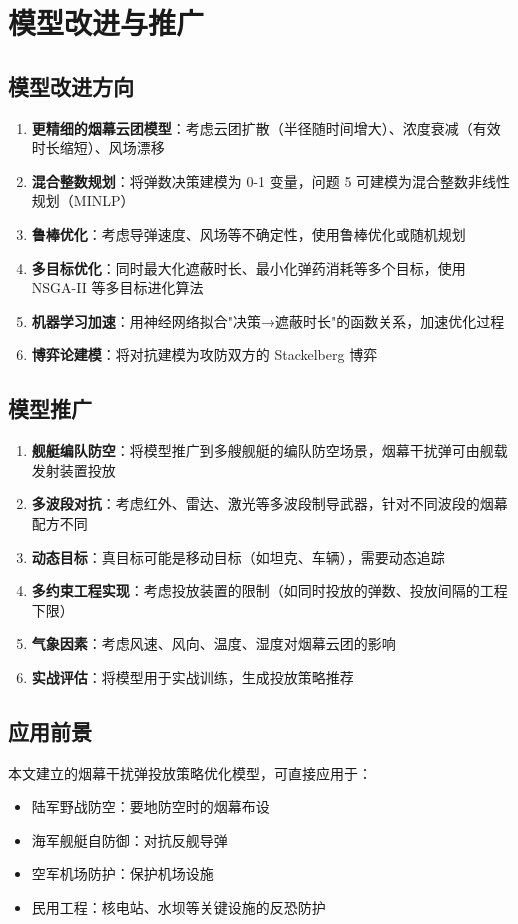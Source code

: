 \section{模型改进与推广}
\subsection{模型改进方向}

\begin{enumerate}
  \item \textbf{更精细的烟幕云团模型}：考虑云团扩散（半径随时间增大）、浓度衰减（有效时长缩短）、风场漂移
  \item \textbf{混合整数规划}：将弹数决策建模为 0-1 变量，问题 5 可建模为混合整数非线性规划（MINLP）
  \item \textbf{鲁棒优化}：考虑导弹速度、风场等不确定性，使用鲁棒优化或随机规划
  \item \textbf{多目标优化}：同时最大化遮蔽时长、最小化弹药消耗等多个目标，使用 NSGA-II 等多目标进化算法
  \item \textbf{机器学习加速}：用神经网络拟合"决策→遮蔽时长"的函数关系，加速优化过程
  \item \textbf{博弈论建模}：将对抗建模为攻防双方的 Stackelberg 博弈
\end{enumerate}

\subsection{模型推广}

\begin{enumerate}
  \item \textbf{舰艇编队防空}：将模型推广到多艘舰艇的编队防空场景，烟幕干扰弹可由舰载发射装置投放
  \item \textbf{多波段对抗}：考虑红外、雷达、激光等多波段制导武器，针对不同波段的烟幕配方不同
  \item \textbf{动态目标}：真目标可能是移动目标（如坦克、车辆），需要动态追踪
  \item \textbf{多约束工程实现}：考虑投放装置的限制（如同时投放的弹数、投放间隔的工程下限）
  \item \textbf{气象因素}：考虑风速、风向、温度、湿度对烟幕云团的影响
  \item \textbf{实战评估}：将模型用于实战训练，生成投放策略推荐
\end{enumerate}

\subsection{应用前景}

本文建立的烟幕干扰弹投放策略优化模型，可直接应用于：
\begin{itemize}
  \item 陆军野战防空：要地防空时的烟幕布设
  \item 海军舰艇自防御：对抗反舰导弹
  \item 空军机场防护：保护机场设施
  \item 民用工程：核电站、水坝等关键设施的反恐防护
\end{itemize}
